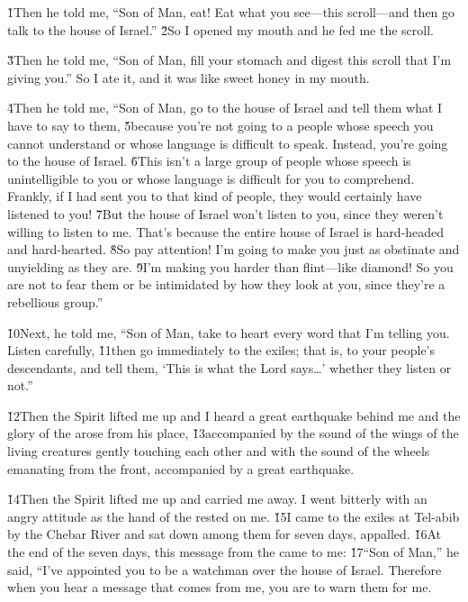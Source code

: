 \v{1}Then he told me, ``Son of Man, eat! Eat what you see---this scroll---and then go talk to the house of Israel.'' \v{2}So I opened my mouth and he fed me the scroll.

\v{3}Then he told me, ``Son of Man, fill your stomach and digest this scroll that I'm giving you.'' So I ate it, and it was like sweet honey in my mouth.

\v{4}Then he told me, ``Son of Man, go to the house of Israel and tell them what I have to say to them, \v{5}because you're not going to a people whose speech you cannot understand or whose language is difficult to speak. Instead, you're going to the house of Israel. \v{6}This isn't a large group of people whose speech is unintelligible to you or whose language is difficult for you to comprehend. Frankly, if I had sent you to that kind of people, they would certainly have listened to you! \v{7}But the house of Israel won't listen to you, since they weren't willing to listen to me. That's because the entire house of Israel is hard-headed and hard-hearted. \v{8}So pay attention! I'm going to make you just as obstinate and unyielding as they are. \v{9}I'm making you harder than flint---like diamond! So you are not to fear them or be intimidated by how they look at you, since they're a rebellious group.''

\v{10}Next, he told me, ``Son of Man, take to heart every word that I'm telling you. Listen carefully, \v{11}then go immediately to the exiles; that is, to your people's descendants, and tell them, `This is what the Lord  says{\ldots}' whether they listen or not.''

\v{12}Then the Spirit lifted me up and I heard a great earthquake behind me and the glory of the  arose from his place, \v{13}accompanied by the sound of the wings of the living creatures gently touching each other and with the sound of the wheels emanating from the front, accompanied by a great earthquake.

\v{14}Then the Spirit lifted me up and carried me away. I went bitterly with an angry attitude as the hand of the  rested on me. \v{15}I came to the exiles at Tel-abib by the Chebar River and sat down among them for seven days, appalled. \v{16}At the end of the seven days, this message from the  came to me: \v{17}``Son of Man,'' he said, ``I've appointed you to be a watchman over the house of Israel. Therefore when you hear a message that comes from me, you are to warn them for me.


